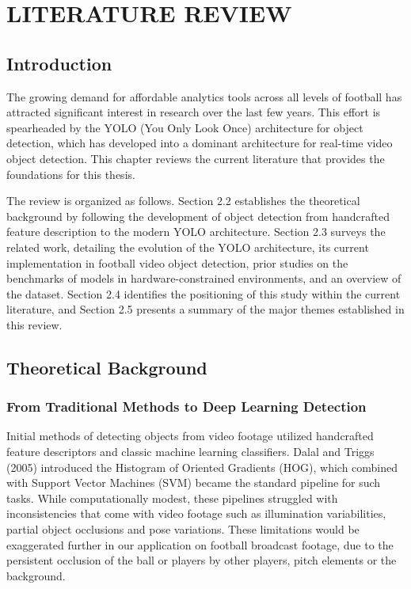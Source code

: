 \chapter{LITERATURE REVIEW}
\label{ch:literature}


\section{Introduction}

The growing demand for affordable analytics tools across all levels of football has attracted significant interest in research over the last few years. This effort is spearheaded by the YOLO (You Only Look Once) architecture for object detection, which has developed into a dominant architecture for real-time video object detection. This chapter reviews the current literature that provides the foundations for this thesis.

The review is organized as follows. Section 2.2 establishes the theoretical background by following the development of object detection from handcrafted feature description to the modern YOLO architecture. Section 2.3 surveys the related work, detailing the evolution of the YOLO architecture, its current implementation in football video object detection, prior studies on the benchmarks of models in hardware-constrained environments, and an overview of the dataset. Section 2.4 identifies the positioning of this study within the current literature, and Section 2.5 presents a summary of the major themes established in this review.


\section{Theoretical Background}

\subsection{From Traditional Methods to Deep Learning Detection}
Initial methods of detecting objects from video footage utilized handcrafted feature descriptors and classic machine learning classifiers. Dalal and Triggs (2005)\cite{RN03} introduced the Histogram of Oriented Gradients (HOG), which combined with Support Vector Machines (SVM) became the standard pipeline for such tasks. While computationally modest, these pipelines struggled with inconsistencies that come with video footage such as illumination variabilities, partial object occlusions and pose variations. These limitations would be exaggerated further in our application on football broadcast footage, due to the persistent occlusion of the ball or players by other players, pitch elements or the background. 

